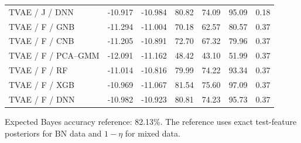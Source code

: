\documentclass[11pt,letterpaper]{article}
\begin{document}
\begin{table}[H]
\begin{tabular}{lrrrrrr}
TVAE / J / DNN & -10.917 & -10.984 & 80.82 & 74.09 & 95.09 & 0.18\\
TVAE / F / GNB & -11.294 & -11.004 & 70.18 & 62.57 & 80.57 & 0.37\\
TVAE / F / CNB & -11.205 & -10.891 & 72.70 & 67.32 & 79.96 & 0.37\\
TVAE / F / PCA--GMM & -12.091 & -11.162 & 48.42 & 43.10 & 51.99 & 0.37\\
TVAE / F / RF & -11.014 & -10.816 & 79.99 & 74.22 & 93.34 & 0.37\\
TVAE / F / XGB & -10.969 & -11.067 & 81.54 & 75.60 & 97.09 & 0.37\\
TVAE / F / DNN & -10.982 & -10.923 & 80.81 & 74.23 & 95.73 & 0.37\\
\bottomrule\end{tabular}
\end{table}
Expected Bayes accuracy reference: 82.13\%. The reference uses exact test-feature posteriors for BN data and $1-\eta$ for mixed data.
\clearpage
\end{document}
